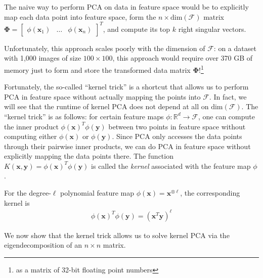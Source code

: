 \documentclass[]{article}
\newcommand{\reals}{\mathbb{R}}
\begin{document}
The naive way to perform PCA on data in feature space would be to explicitly map each data point into feature space, form the $n \times \text{dim}(\mathcal{F})$ matrix
$\boldsymbol{\Phi} = \begin{bmatrix} \phi(\mathbf{x}_1) & \hdots & \phi(\mathbf{x}_n) \end{bmatrix}^T$, and compute its top $k$ right singular vectors.

Unfortunately, this approach scales poorly with the dimension of $\mathcal{F}$: on a dataset with 1,000 images of size $100 \times 100$, this approach would require 
over 370 GB of memory just to form and store the transformed data matrix $\boldsymbol{\Phi}$!\footnote{as a matrix of 32-bit floating point numbers}

Fortunately, the so-called ``kernel trick'' is a shortcut that allows us to perform PCA in feature space without actually mapping the points into $\mathcal{F}$.
In fact, we will see that the runtime of kernel PCA does not depend at all on $\text{dim}(\mathcal{F})$.
The ``kernel trick'' is as follows: for certain feature maps $\phi: \reals^d \to \mathcal{F}$, one can compute the inner product $\phi(\mathbf{x})^T \phi(\mathbf{y})$ between two points in feature space without computing either $\phi(\mathbf{x})$ or $\phi(\mathbf{y})$.
Since PCA only accesses the data points through their pairwise inner products, we can do PCA in feature space without explicitly mapping the data points there.
The function $K(\mathbf{x}, \mathbf{y}) = \phi(\mathbf{x})^T \phi(\mathbf{y})$ is called the \textit{kernel} associated with the feature map $\phi$ \cite{scholkopf2002}.


For the degree-$\ell$ polynomial feature map $\phi(\mathbf{x}) = \mathbf{x}^{\otimes \ell}$, the corresponding kernel is \begin{align}\phi(\mathbf{x})^T \phi(\mathbf{y}) = (\mathbf{x}^T \mathbf{y})^\ell
\end{align}


We now show that the kernel trick allows us to solve kernel PCA via the eigendecomposition of an $n \times n$ matrix.
\end{document}
